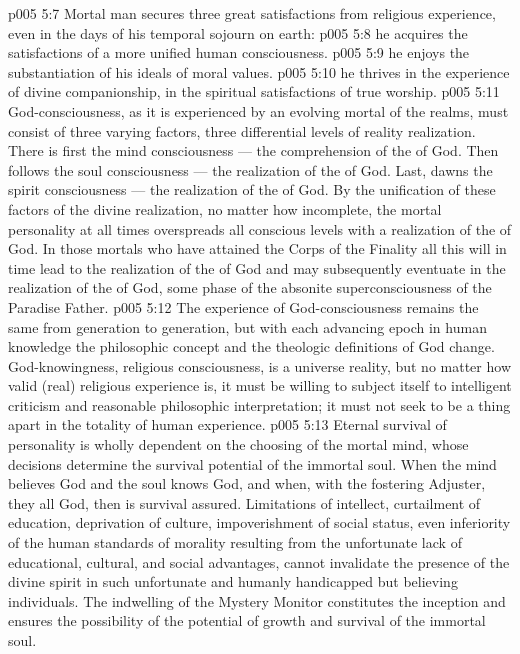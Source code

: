 \vs p005 5:7 \pc Mortal man secures three great satisfactions from religious experience, even in the days of his temporal sojourn on earth:
\vs p005 5:8 \bibnobreakspace {} he acquires the satisfactions of a more unified human consciousness.
\vs p005 5:9 \bibnobreakspace {} he enjoys the substantiation of his ideals of moral values.
\vs p005 5:10 \bibnobreakspace {} he thrives in the experience of divine companionship, in the spiritual satisfactions of true worship.
\vs p005 5:11 \pc God\hyp{}consciousness, as it is experienced by an evolving mortal of the realms, must consist of three varying factors, three differential levels of reality realization. There is first the mind consciousness --- the comprehension of the  of God. Then follows the soul consciousness --- the realization of the  of God. Last, dawns the spirit consciousness --- the realization of the  of God. By the unification of these factors of the divine realization, no matter how incomplete, the mortal personality at all times overspreads all conscious levels with a realization of the  of God. In those mortals who have attained the Corps of the Finality all this will in time lead to the realization of the  of God and may subsequently eventuate in the realization of the  of God, some phase of the absonite superconsciousness of the Paradise Father.
\vs p005 5:12 The experience of God\hyp{}consciousness remains the same from generation to generation, but with each advancing epoch in human knowledge the philosophic concept and the theologic definitions of God  change. God\hyp{}knowingness, religious consciousness, is a universe reality, but no matter how valid (real) religious experience is, it must be willing to subject itself to intelligent criticism and reasonable philosophic interpretation; it must not seek to be a thing apart in the totality of human experience.
\vs p005 5:13 \pc Eternal survival of personality is wholly dependent on the choosing of the mortal mind, whose decisions determine the survival potential of the immortal soul. When the mind believes God and the soul knows God, and when, with the fostering Adjuster, they all  God, then is survival assured. Limitations of intellect, curtailment of education, deprivation of culture, impoverishment of social status, even inferiority of the human standards of morality resulting from the unfortunate lack of educational, cultural, and social advantages, cannot invalidate the presence of the divine spirit in such unfortunate and humanly handicapped but believing individuals. The indwelling of the Mystery Monitor constitutes the inception and ensures the possibility of the potential of growth and survival of the immortal soul.
